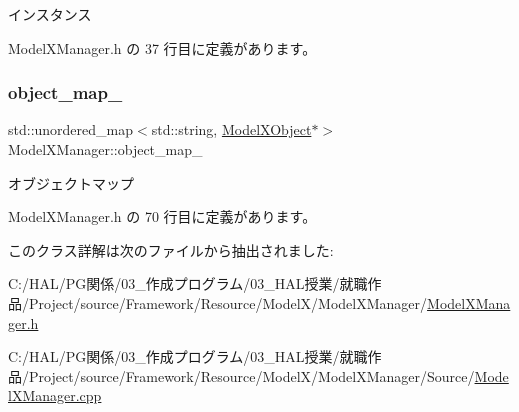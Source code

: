 インスタンス 



 Model\+X\+Manager.\+h の 37 行目に定義があります。

\mbox{\label{class_model_x_manager_ac3a90eea2890ea233f6f8c909f705e16}} 
\subsubsection{\texorpdfstring{object\+\_\+map\+\_\+}{object\_map\_}}
{\footnotesize\ttfamily std\+::unordered\+\_\+map$<$std\+::string, \mbox{\hyperlink{class_model_x_object}{Model\+X\+Object}}$\ast$$>$ Model\+X\+Manager\+::object\+\_\+map\+\_\+\hspace{0.3cm}{\ttfamily [private]}}



オブジェクトマップ 



 Model\+X\+Manager.\+h の 70 行目に定義があります。



このクラス詳解は次のファイルから抽出されました\+:\begin{DoxyCompactItemize}
\item 
C\+:/\+H\+A\+L/\+P\+G関係/03\+\_\+作成プログラム/03\+\_\+\+H\+A\+L授業/就職作品/\+Project/source/\+Framework/\+Resource/\+Model\+X/\+Model\+X\+Manager/\mbox{\hyperlink{_model_x_manager_8h}{Model\+X\+Manager.\+h}}\item 
C\+:/\+H\+A\+L/\+P\+G関係/03\+\_\+作成プログラム/03\+\_\+\+H\+A\+L授業/就職作品/\+Project/source/\+Framework/\+Resource/\+Model\+X/\+Model\+X\+Manager/\+Source/\mbox{\hyperlink{_model_x_manager_8cpp}{Model\+X\+Manager.\+cpp}}\end{DoxyCompactItemize}
